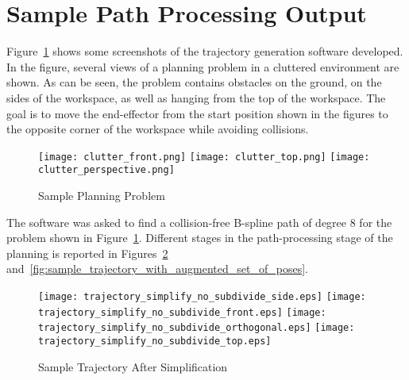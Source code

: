 \section{Sample Path Processing Output}%

	Figure~\ref{fig:sample_planning_problem} shows some screenshots of the
	trajectory generation software developed. In the figure, several views
	of a planning problem in a cluttered environment are shown. As can be
	seen, the problem contains obstacles on the ground, on the sides of the
	workspace, as well as hanging from the top of the workspace. The goal is
	to move the end-effector from the start position shown in the figures to
	the opposite corner of the workspace while avoiding collisions.

	\begin{figure}[hbt]
		\centering
		\texttt{[image: clutter\_front.png]}
		\texttt{[image: clutter\_top.png]}
		\texttt{[image: clutter\_perspective.png]}
		\caption{Sample Planning Problem}
		\label{fig:sample_planning_problem}
	\end{figure}

	The software was asked to find a collision-free B-spline path of degree 8
	for the problem shown in Figure~\ref{fig:sample_planning_problem}. Different
	stages in the path-processing stage of the planning is reported in
	Figures~\ref{fig:sample_trajectory_after_simplification}
	and~\ref{fig:sample_trajectory_with_augmented_set_of_poses}.


	\begin{figure}[hb]
		\centering
		\begin{minipage}{0.8\linewidth}
			\texttt{[image: trajectory\_simplify\_no\_subdivide\_side.eps]}
			\texttt{[image: trajectory\_simplify\_no\_subdivide\_front.eps]}
			\texttt{[image: trajectory\_simplify\_no\_subdivide\_orthogonal.eps]}
			\texttt{[image: trajectory\_simplify\_no\_subdivide\_top.eps]}
		\end{minipage}
		\caption{Sample Trajectory After Simplification}
		\label{fig:sample_trajectory_after_simplification}
	\end{figure}


